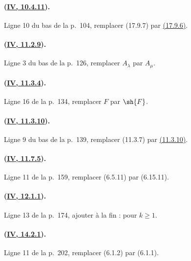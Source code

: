 \paragraph{({\texorpdfstring{\protect\hyperlink{ega4.c04.statement.10-4-11}{IV, 10.4.11}}{IV, 10.4.11}}).}
Ligne 10 du bas de la p.~104, remplacer (17.9.7) par
{\hyperlink{ega4.c04.prop.17-9-6}{(17.9.6)}}.

\paragraph{({\texorpdfstring{\protect\hyperlink{ega4.c04.thm.11-2-9}{IV, 11.2.9}}{IV, 11.2.9}}).}
Ligne 3 du bas de la p.~126, remplacer $A_\lambda$ par $A_\mu$.

\paragraph{({\texorpdfstring{\protect\hyperlink{ega4.c04.prop.11-3-4}{IV, 11.3.4}}{IV, 11.3.4}}).}
Ligne 16 de la p.~134, remplacer $F$ par $\sh{F}$.

\paragraph{({\texorpdfstring{\protect\hyperlink{ega4.c04.thm.11-3-10}{IV, 11.3.10}}{IV, 11.3.10}}).}
Ligne 9 du bas de la p.~139, remplacer (11.3.7) par
{\hyperlink{ega4.c04.thm.11-3-10}{(11.3.10)}}.

\paragraph{({\texorpdfstring{\protect\hyperlink{ega4.c04.statement.11-7-5}{IV, 11.7.5}}{IV, 11.7.5}}).}
Ligne 11 de la p.~159, remplacer (6.5.11) par (6.15.11).

\paragraph{({\texorpdfstring{\protect\hyperlink{ega4.c04.thm.12-1-1}{IV, 12.1.1}}{IV, 12.1.1}}).}
Ligne 13 de la p.~174, ajouter à la fin : pour $k\geq1$.

\paragraph{({\texorpdfstring{\protect\hyperlink{ega4.c04.thm.14-2-1}{IV, 14.2.1}}{IV, 14.2.1}}).}
Ligne 11 de la p.~202, remplacer (6.1.2) par (6.1.1).


